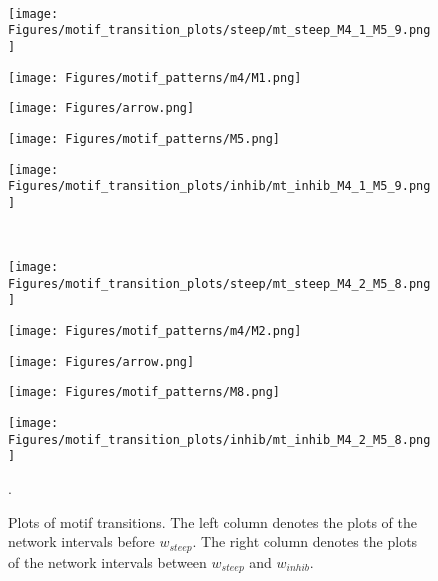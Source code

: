 \documentclass[smallextended]{svjour3}       %
\theoremstyle{definition}
\begin{document}
\begin{figure}[]
 	\hfill
 	\\
 	\hfill
 	\begin{minipage}{0.32\textwidth}%
 		\texttt{[image: Figures/motif\_transition\_plots/steep/mt\_steep\_M4\_1\_M5\_9.png]}
 	\end{minipage}
 	\hfill
 	\begin{minipage}{0\textwidth}%
 		\texttt{[image: Figures/motif\_patterns/m4/M1.png]}	
 	\end{minipage}
 	\hfill
 	\begin{minipage}{0\textwidth}%
 		\texttt{[image: Figures/arrow.png]}	
 	\end{minipage}
 	\hfill
 	\begin{minipage}{0.05\textwidth}%
 		\texttt{[image: Figures/motif\_patterns/M5.png]}	
 	\end{minipage}
 	\hfill
 	\begin{minipage}{0.25\textwidth}
 		\texttt{[image: Figures/motif\_transition\_plots/inhib/mt\_inhib\_M4\_1\_M5\_9.png]}
 	\end{minipage}
 	\hfill
 	\\
 	\hfill
 	\begin{minipage}{0.32\textwidth}%
 		\texttt{[image: Figures/motif\_transition\_plots/steep/mt\_steep\_M4\_2\_M5\_8.png]}
 	\end{minipage}
 	\hfill
 	\begin{minipage}{0\textwidth}%
 		\texttt{[image: Figures/motif\_patterns/m4/M2.png]}	
 	\end{minipage}
 	\hfill
 	\begin{minipage}{0\textwidth}%
 		\texttt{[image: Figures/arrow.png]}	
 	\end{minipage}
 	\hfill
 	\begin{minipage}{0.05\textwidth}%
 		\texttt{[image: Figures/motif\_patterns/M8.png]}	
 	\end{minipage}
 	\hfill
 	\begin{minipage}{0.25\textwidth}
 		\texttt{[image: Figures/motif\_transition\_plots/inhib/mt\_inhib\_M4\_2\_M5\_8.png]}
 	\end{minipage}
 	\hfill
 	\caption{Plots of motif transitions. The left column denotes the plots of the network intervals before $w_{steep}$. The right column denotes the plots of the network intervals between $w_{steep}$ and $w_{inhib}$.}. 
 \end{figure}{\label{fig:motif_trans}}
\end{document}
